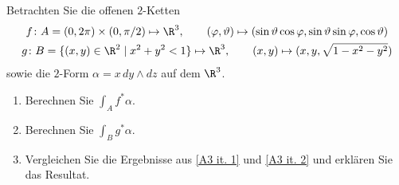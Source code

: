                 \begin{prob}
%
Betrachten Sie die offenen $2$-Ketten 
\begin{gather*}
	f \colon A = (0,2\pi) \times (0,\pi/2) \mapsto \R^3, \qquad
	(\varphi, \vartheta) \mapsto (\sin\vartheta \cos\varphi, \sin\vartheta\sin\varphi,\cos\vartheta) \cr
	g \colon B = \{(x,y) \in \R^2 \mid x^2+y^2 < 1 \} \mapsto \R^3, \qquad (x,y) \mapsto (x, y, \sqrt{1-x^2-y^2} )
\end{gather*}
sowie die $2$-Form $\alpha = x\, dy \wedge dz$ auf dem $\R^3$. 

\begin{enumerate}[label = (\alph*)]
	\item Berechnen Sie $\int_Af^*\alpha$. \label{A3 it. 1}
	\item Berechnen Sie $\int_Bg^*\alpha$. \label{A3 it. 2}
	\item Vergleichen Sie die Ergebnisse aus \ref{A3 it. 1} und \ref{A3 it. 2} und erkl\"aren Sie das Resultat.
\end{enumerate}

\vspace{2mm}
                \end{prob}
